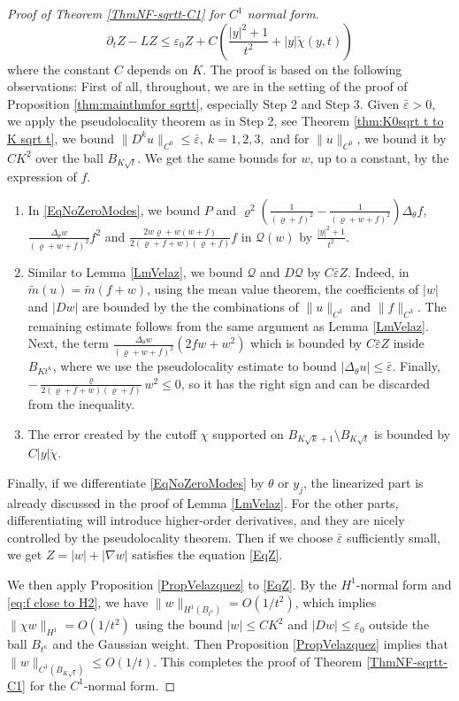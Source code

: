 \documentclass[11pt]{amsart}
\numberwithin{equation}{section}
\numberwithin{equation}{section}
\newcommand{\eps}{\varepsilon}
\newcommand{\pr}{\partial}
\begin{document}
\begin{proof}[Proof of Theorem \ref{ThmNF-sqrtt-C1} for $C^1$ normal form]
		\begin{equation}\label{EqZ}
			\pr_tZ-LZ
			\leq
			\eps_0Z+C(\frac{|y|^2+1}{t^2}+|y|\check\chi(y,t))    
		\end{equation}
		where the constant $C$ depends on $K$.
		The proof is based on the following observations: First of all, throughout, we are in the setting of the proof of Proposition \ref{thm:mainthmfor sqrtt}, especially Step 2 and Step 3. Given $\bar\eps>0$, we apply the pseudolocality theorem as in Step 2, see Theorem \ref{thm:K0sqrt t to K sqrt t}, we bound $\|D^ku\|_{C^0}\leq\bar\eps,\ k=1,2,3,$ and for $\|u\|_{C^0}$, we bound it by $CK^2$ over the ball $B_{K \sqrt{t}}$. We get the same bounds for $w$, up to a constant, by the expression of $f$.
		\begin{enumerate}
			\item In \eqref{EqNoZeroModes}, we bound $P$ and $\varrho^2\left(\frac{1}{(\varrho+f)^2}-\frac{1}{(\varrho+w+f)^2}
			\right)\Delta_\theta f$, $\frac{\Delta_\theta w}{(\varrho+w+f)^2}f^2$ and $\frac{2w\varrho+w(w+f)}{2(\varrho+f+w)(\varrho+f)}f$ in $\mathscr Q(w)$ by $\frac{|y|^2+1}{t^2}.$ 
			
			\item Similar to Lemma \ref{LmVelaz}, we bound $\mathscr{Q}$ and $D\mathscr Q$ by $C\bar\eps Z$. Indeed, in $\tilde m(u)=\tilde m(f+w)$, using the mean value theorem, the coefficients of $|w|$ and $|Dw|$ are bounded by the the combinations of $\|u\|_{C^3}$ and $\|f\|_{C^3}$. The remaining estimate follows from the same argument as Lemma \ref{LmVelaz}. Next, the term $\frac{\Delta_\theta w}{(\varrho+w+f)^2}(2fw+w^2)$ which is bounded by $C\bar\eps Z$ inside $B_{K t^\kappa}$, where we use the pseudolocality estimate to bound $|\Delta_\theta u|\leq\bar\eps.$ Finally, $-\frac{\varrho}{2(\varrho+f+w)(\varrho+f)}w^2\leq 0$, so it has the right sign and can be discarded from the inequality.
			
			
			\item The error created by the cutoff $\chi$ supported on $B_{K\sqrt{k}+1}\setminus B_{K\sqrt{t}}$ is bounded by $C|y|\check{\chi}$. 
		\end{enumerate}
		
		Finally, if we differentiate \eqref{EqNoZeroModes} by $\theta$ or $y_j$, the linearized part is already discussed in the proof of Lemma \ref{LmVelaz}. For the other parts, differentiating will introduce higher-order derivatives, and they are nicely controlled by the pseudolocality theorem. Then if we choose $\bar\eps$ sufficiently small, we get $Z=|w|+|\nabla w|$ satisfies the equation \eqref{EqZ}.
		
		
		We then apply  Proposition \ref{PropVelazquez} to  \eqref{EqZ}.  By the $H^1$-normal form and \eqref{eq:f close to H2}, we have $\|w\|_{H^1(B_{t^\kappa})}=O(1/t^2)$, which implies $\|\chi w\|_{H^1}=O(1/t^2)$ using the bound $|w|\leq CK^2$ and $|Dw|\leq\eps_0$ outside the ball $B_{t^\kappa}$ and the Gaussian weight.  Then Proposition \ref{PropVelazquez} implies that $\|w\|_{C^1(B_{K\sqrt{t}})}\leq O(1/t)$. 
		This completes the proof of Theorem \ref{ThmNF-sqrtt-C1} for the $C^1$-normal form. 
	\end{proof}
	
\end{document}
